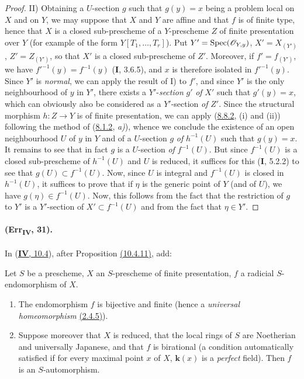 \begin{proof}
\textup{II)} Obtaining a $U$-section $g$ such that $g(y)=x$ being
a problem local on $X$ and on $Y$, we may suppose that $X$ and $Y$
are affine and that $f$ is of finite type, hence that $X$ is a
closed sub-prescheme of a $Y$-prescheme $Z$ of finite presentation over
$Y$ (for example of the form $Y[T_1,\ldots,T_r]$). Put $Y'=\operatorname{Spec}(\mathscr{O}_{Y,y})$, $X'=X_{(Y')}$, $Z'=Z_{(Y')}$,
so that $X'$ is a closed sub-prescheme of $Z'$. Moreover, if
$f'=f_{(Y')}$, we have $f'^{-1}(y)=f^{-1}(y)$ (\textbf{I}, 3.6.5), and $x$ is therefore
isolated in $f'^{-1}(y)$. Since $Y'$ is \emph{normal}, we can apply the
result of I) to $f'$, and since $Y'$ is the only neighbourhood of $y$ in
$Y'$, there exists a $Y'$-\emph{section} $g'$ \emph{of} $X'$ such that $g'(y)=x$, which
can obviously also be considered as a $Y'$-section \emph{of} $Z'$.
Since the structural morphism $h:Z\to Y$ is of finite presentation,
we can apply ({\hyperref[IV.8.8.2]{8.8.2}}, (i) and
(ii)) following the method of
({\hyperref[IV.8.1.2]{8.1.2}}, \emph{a)}), whence we conclude
the existence of an open neighbourhood $U$ of $y$ in $Y$ and of a
$U$-section $g$ \emph{of} $h^{-1}(U)$ such that $g(y)=x$. It remains to see
that in fact $g$ is a $U$-section \emph{of} $f^{-1}(U)$. But since
$f^{-1}(U)$ is a closed sub-prescheme of $h^{-1}(U)$ and $U$ is
reduced, it suffices for this (\textbf{I}, 5.2.2) to see that
$g(U)\subset f^{-1}(U)$. Now, since $U$ is integral and $f^{-1}(U)$ is
closed in $h^{-1}(U)$, it suffices to prove that if $\eta$ is the generic
point of $Y$ (and of $U$), we have $g(\eta)\in f^{-1}(U)$. Now, this
follows from the fact that the restriction of $g$ to $Y'$ is a $Y'$-section of
$X'\subset f^{-1}(U)$ and from the fact that $\eta\in Y'$.
\end{proof}

\paragraph{(Err\textsubscript{\textmd{IV}}, 31).}
In ({\hyperref[subsection:IV.10.4]{\textbf{IV}, 10.4}}), after Proposition {\hyperref[IV.10.4.11]{(10.4.11)}}, add:

\begin{corollary}[10.4.12]
\label{IV.10.4.12}
Let $S$ be a prescheme, $X$ an $S$-prescheme of finite presentation,
$f$ a radicial $S$-endomorphism of $X$.
\begin{enumerate}[label=\textup{(\roman*)}]
\item The endomorphism $f$ is bijective and \textup{finite (hence a \emph{universal
homeomorphism} {\hyperref[IV.2.4.5]{(2.4.5)}})}.
\item Suppose moreover that $X$ is reduced, that the local rings of
$S$ are Noetherian and universally Japanese, and that $f$ is
birational \textup{(a condition automatically satisfied if for every
maximal point $x$ of $X$, $\boldsymbol{k}(x)$ is a \emph{perfect} field)}. Then $f$ is an
$S$-automorphism.
\end{enumerate}
\end{corollary}

